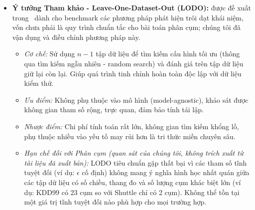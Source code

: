 \begin{enumerate}[label=\textbf{C\arabic*.},leftmargin=2.2em]
\begin{itemize}[leftmargin=1.2em,itemsep=2pt,topsep=1pt]
    \item \textbf{Ý tưởng Tham khảo - Leave-One-Dataset-Out (LODO):} được đề xuất trong~\cite{cerqueira2026framework} dành cho benchmark các phương pháp phát hiện trôi dạt khái niệm, vốn chưa phải là quy trình chuẩn tắc cho bài toán phân cụm; chúng tôi đã vận dụng và điều chỉnh phương pháp này.
    \begin{itemize}[leftmargin=1.2em,itemsep=1pt]
      \item \emph{Cơ chế:} Sử dụng $n-1$ tập dữ liệu để tìm kiếm cấu hình tối ưu (thông qua tìm kiếm ngẫu nhiên - random search) và đánh giá trên tập dữ liệu giữ lại còn lại. Giúp quá trình tinh chỉnh hoàn toàn độc lập với dữ liệu kiểm thử.
      \item \emph{Ưu điểm:} Không phụ thuộc vào mô hình (model-agnostic), khảo sát được không gian tham số rộng, trực quan, đảm bảo tính tái lập.
      \item \emph{Nhược điểm:} Chi phí tính toán rất lớn, không gian tìm kiếm khổng lồ, phụ thuộc nhiều vào yếu tố may rủi hơn là tri thức miền chuyên sâu.
      \item \emph{Hạn chế đối với Phân cụm (quan sát của chúng tôi, không trích xuất từ tài liệu đã xuất bản):} LODO tiêu chuẩn gặp thất bại vì các tham số tĩnh tuyệt đối (ví dụ: $\epsilon$ cố định) không mang ý nghĩa hình học nhất quán giữa các tập dữ liệu có số chiều, thang đo và số lượng cụm khác biệt lớn (ví dụ: KDD99 có 23 cụm so với Shuttle chỉ có 2 cụm). Không thể tồn tại một giá trị tĩnh tuyệt đối nào phù hợp cho mọi trường hợp.
    \end{itemize}


\end{itemize}
\end{enumerate}
